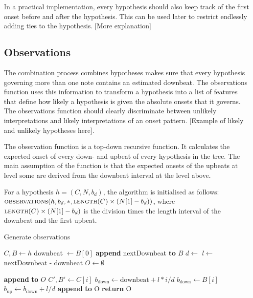 In a practical implementation, every hypothesis should also keep track of the first onset before and after the hypothesis. This can be used later to restrict endlessly adding ties to the hypothesis. [More explanation]

\subsection{Observations}
\label{sec:observations}

The combination process combines hypotheses makes sure that every hypothesis governing more than one note contains an estimated downbeat. The observations function uses this information to transform a hypothesis into a list of features that define how likely a hypothesis is given the absolute onsets that it governs. The observations function should clearly discriminate between unlikely interpretations and likely interpretations of an onset pattern. [Example of likely and unlikely hypotheses here].

The observation function is a top-down recursive function. It calculates the expected onset of every down- and upbeat of every hypothesis in the tree. The main assumption of the function is that the expected onsets of the upbeats at level some are derived from the downbeat interval at the level above. 

For a hypothesis $h = (C, N, b_d)$, the algorithm is initialised as follows: $\textsc{observations}(h, b_d, *, \textsc{length}(C) \times (N[1] - b_d))$, where $\textsc{length}(C) \times (N[1] - b_d)$ is the division times the length interval of the downbeat and the first upbeat.
\begin{algorithm}
\caption{Generate observations}
\label{alg:observations}
\begin{algorithmic}
	\State $C, B \leftarrow h$
		\State downbeat $\leftarrow B[0]$
	\EndIf
	\State \textbf{append} nextDownbeat \textbf{to} $B$
	\State $d \leftarrow$ 
	\State $l \leftarrow$ nextDownbeat - downbeat
	\State $O \leftarrow \emptyset$

			\State \textbf{append}  \textbf{to} $O$
		\EndIf	
		\State $C', B' \leftarrow C[i]$
			\State $b_{\mathrm{down}} \leftarrow \mathrm{downbeat} + l * i/d$
				\State $b_{\mathrm{down}} \leftarrow B[i]$
			\EndIf
			\State $b_{\mathrm{up}} \leftarrow b_{\mathrm{down}} + l/d$
			\State \textbf{append}  \textbf{to} O
		\EndIf
	\EndFor
	\State \textbf{return} O
\EndFunction
\end{algorithmic}
\end{algorithm}

